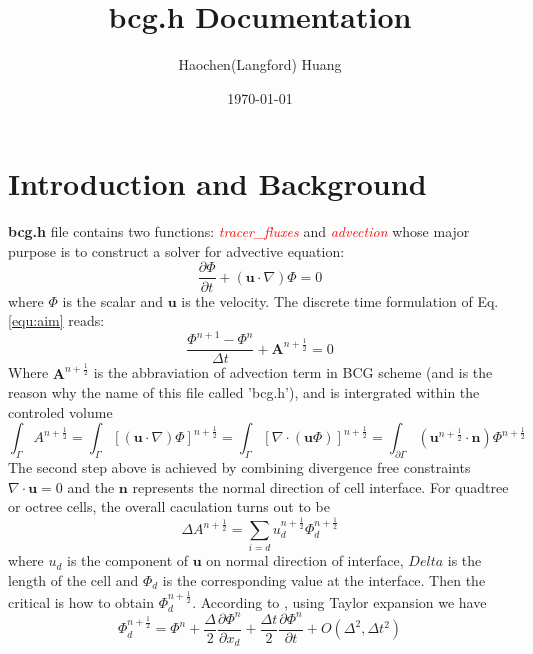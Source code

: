 \documentclass[a4paper]{article}
\title{bcg.h Documentation}
\author{Haochen(Langford) Huang}
\date{\today}
\begin{document}
\maketitle

\section{Introduction and Background}\label{sec:intro}
\textbf{bcg.h} file contains two functions: \textcolor{red}{\emph{tracer\_fluxes}} and \textcolor{red}{\emph{advection}} whose major purpose is to construct a solver for advective equation:
\begin{equation}
  \frac{\partial \Phi}{\partial t} + ( \mathbf{u} \cdot \nabla)\Phi = 0\label{equ:aim}
\end{equation}
where $\Phi$ is the scalar and $ \mathbf{u}$ is the velocity. The discrete time formulation of Eq.\ref{equ:aim} reads:
\begin{equation}
  \frac{\Phi^{n+1}-\Phi^{n}}{\Delta t} + \mathbf{A}^{n+\frac{1}{2}} = 0 \label{equ:general}
\end{equation}
Where $ \mathbf{A}^{n+ \frac{1}{2}}$ is the abbraviation of advection term in BCG\cite{bell1989second,popinet2003gerris} scheme (and is the reason why the name of this file called 'bcg.h'), and is intergrated within the controled volume
\begin{equation}
  \int_{\Gamma} A^{n+ \frac{1}{2}} = \int_{\Gamma} [( \mathbf{u}\cdot \nabla)\Phi]^{n+ \frac{1}{2}} = \int_{\Gamma} [\nabla\cdot( \mathbf{u} \Phi)]^{n+ \frac{1}{2}} = \int_{\partial \Gamma} ( \mathbf{u}^{n + \frac{1}{2}} \cdot \mathbf{n}) \Phi^{n+ \frac{1}{2}}
\end{equation}
The second step above is achieved by combining divergence free constraints $\nabla\cdot \mathbf{u}=0$ and the $ \mathbf{n}$ represents the normal direction of cell interface. For quadtree or octree cells, the overall caculation turns out to be
\begin{equation}
  \Delta A^{n+ \frac{1}{2}} = \sum_{i=d} u_d^{n+ \frac{1}{2}}\Phi_d^{n + \frac{1}{2}} 
\end{equation}
where $u_d$ is the component of $ \mathbf{u}$ on normal direction of interface, $Delta$ is the length of the cell and $\Phi_d$ is the corresponding value at the interface. Then the critical is how to obtain $\Phi_d^{n + \frac{1}{2}}$. According to \cite{popinet2003gerris}, using Taylor expansion we have
\begin{equation}
  \Phi^{n+ \frac{1}{2}}_d = \Phi^n+ \frac{\Delta}{2} \frac{\partial \Phi^n}{\partial x_d} + \frac{\Delta t}{2} \frac{\partial \Phi^n}{\partial t} + O(\Delta^2,\Delta t^2)
\end{equation}
\end{document}
